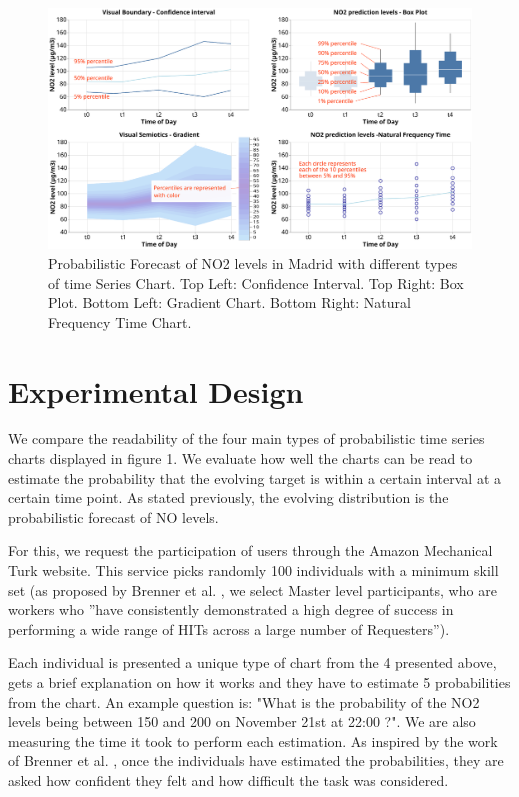 \documentclass[a4paper,3p,sort&compress]{elsarticle}
\begin{document}
\begin{figure}
  \centering
  \includegraphics[width=.9\textwidth]{charts_vector} 
  \caption{\label{figure:charts} Probabilistic Forecast of NO2 levels in Madrid with different types of time Series Chart. 
  Top Left: Confidence Interval. Top Right: Box Plot. 
  Bottom Left: Gradient Chart. Bottom Right: Natural Frequency Time Chart. }
\end{figure} 

\section{Experimental Design}
\label{sec:exp_design}

We compare the readability of the four main types of probabilistic time series charts 
displayed in figure 1. We evaluate how well the charts can be read to estimate the probability 
that the evolving target is within a certain interval at a certain time point. As stated previously, 
the evolving distribution is the probabilistic forecast of NO levels. 

For this, we request the participation of users through the Amazon Mechanical Turk website. 
This service picks randomly 100 individuals with a minimum skill set (as proposed by Brenner 
et al. \cite{brennen_instrument_2018}, we select Master level participants, who are workers who 
''have consistently demonstrated a high degree of success in performing a wide range of HITs across a 
large number of Requesters'').

Each individual is presented a unique type of chart from the 4 presented above, gets a brief 
explanation on how it works and they have to estimate 5 probabilities from the chart. An example question is: 
"What is the probability of the NO2 levels being between 150 and 200 on 
November 21st at 22:00 ?". We are also measuring the time it took to perform each estimation. 
As inspired by the work of Brenner et 
al. , once the individuals have estimated the probabilities, they are asked how confident they 
felt and how difficult the task was considered.
\end{document}
